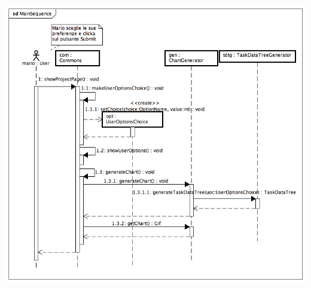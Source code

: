 \documentclass[a4paper, 12pt]{report}
\begin{document}
\includegraphics[width=\textwidth]{chart/MainSequence.png}
\end{document}
